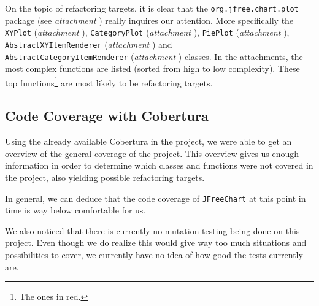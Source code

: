 \documentclass[11pt]{article}
\begin{document}
	On the topic of refactoring targets, it is clear that the \texttt{org.jfree.chart.plot} package (see \textsl{attachment \pageref{refactoring-package-plot}}) really inquires our attention. More specifically the \texttt{XYPlot} (\textsl{attachment \pageref{refactoring-XYPlot}}), \texttt{CategoryPlot} (\textsl{attachment \pageref{refactoring-CategoryPlot}}), \texttt{PiePlot} (\textsl{attachment \pageref{refactoring-PiePlot}}), \texttt{AbstractXYItemRenderer} (\textsl{attachment \pageref{refactoring-AbstractXYItemRenderer}}) and\\ \texttt{AbstractCategoryItemRenderer} (\textsl{attachment \pageref{refactoring-AbstractCategoryItemRenderer}}) classes. In the attachments, the most complex functions are listed (sorted from high to low complexity). These top functions\footnote{The ones in red.} are most likely to be refactoring targets.
	
	\subsection{Code Coverage with Cobertura}
	Using the already available \textsf{Cobertura} in the project, we were able to get an overview of the general coverage of the project. This overview gives us enough information in order to determine which classes and functions were not covered in the project, also yielding possible refactoring targets.
	
	In general, we can deduce that the code coverage of \texttt{JFreeChart} at this point in time is way below comfortable for us.
	
	We also noticed that there is currently no mutation testing being done on this project. Even though we do realize this would give way too much situations and possibilities to cover, we currently have no idea of how good the tests currently are.
	
%	
	
\end{document}
